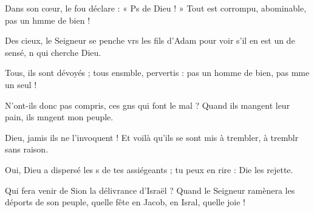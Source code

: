 \item Dans son cœur, le fou déclare : « Ps de Dieu ! »\psstar{} Tout est corrompu, abominable, pas un hmme de bien !
\item Des cieux, le Seigneur se penche vrs les fils d’Adam\psstar{} pour voir s’il en est un de sensé, n qui cherche Dieu.
\item Tous, ils sont dévoyés ; tous ensmble, pervertis :\psstar{} pas un homme de bien, pas mme un seul !
\item N’ont-ils donc pas compris, ces gns qui font le mal ?\psstar{} Quand ils mangent leur pain, ils mngent mon peuple.
\item Dieu, jamis ils ne l’invoquent !\psstar{} Et voilà qu’ils se sont mis à trembler, à tremblr sans raison.
\item Oui, Dieu a dispersé les s de tes assiégeants ;\psstar{} tu peux en rire : Die les rejette.
\item Qui fera venir de Sion la délivrance d’Israël ?\pscross{} Quand le Seigneur ramènera les déports de son peuple,\psstar{} quelle fête en Jacob, en Isral, quelle joie !